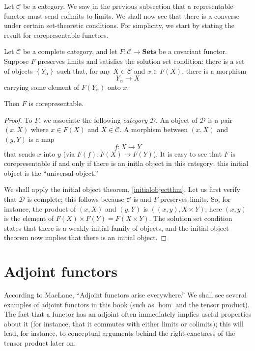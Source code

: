 Let $\mathcal{C}$ be a category.
We saw in the previous subsection that a representable functor must send
colimits to limits. 
We shall now see that there is a converse under certain set-theoretic
conditions.
For simplicity, we start by stating the result for corepresentable functors.

\begin{theorem}
Let $\mathcal{C}$ be a complete category, and let $F: \mathcal{C} \to
\mathbf{Sets}$ be a covariant functor. Suppose $F$ preserves limits and satisfies the solution set condition: 
there is a set of objects $\left\{Y_\alpha\right\}$ such that, for any $X \in
\mathcal{C}$ and $x \in F(X)$, there is a morphism
\[ Y_\alpha \to X  \]
carrying some element of $F(Y_\alpha)$ onto $x$.

Then $F$ is corepresentable.
\end{theorem} 
\begin{proof} 
To $F$, we associate the following \emph{category} $\mathcal{D}$. An object of
$\mathcal{D}$ is a pair $(x, X)$ where $x \in F(X)$ and $X \in \mathcal{C}$.
A morphism between $(x, X)$ and $(y, Y)$ is a map
\[ f:X \to Y  \]
that sends $x$ into $y$ (via $F(f): F(X) \to F(Y)$).
It is easy to see that $F$ is corepresentable if and only if there is an initla
object in this category; this initial object is the ``universal object.''

We shall apply the initial object theorem, \cref{initialobjectthm}. Let us first verify that
$\mathcal{D}$ is complete; this follows because $\mathcal{C}$ is and $F$
preserves limits. So, for instance, the product of $(x, X)$ and $(y, Y)$ is
$((x,y), X \times Y)$; here $(x,y)$ is the element of $F(X) \times F(Y) = F(X
\times Y)$.
The solution set condition states that there is a weakly 
initial family of objects, and the initial object theorem now implies that
there is an initial object. 
\end{proof} 
\section{Adjoint functors}

According to MacLane, ``Adjoint functors arise everywhere.'' We shall see
several examples of adjoint functors in this book (such as $\hom$ and the
tensor product). The fact that a functor has an adjoint often immediately
implies useful properties about it (for instance, that it commutes with either
limits or colimits); this will lead, for instance, to conceptual arguments
behind the right-exactness of the tensor product later on.



